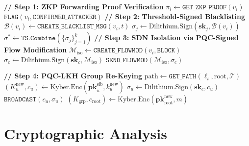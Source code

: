 \documentclass[12pt, a4paper]{report}
\begin{document}
\begin{algorithm}[htb]
\caption{Post-Quantum Cryptographic Mitigation and Node Isolation (\texttt{PQC-Mit})}
\begin{algorithmic}[1]
\small
{}
  \State \textbf{// Step 1: ZKP Forwarding Proof Verification}
  \State $\pi_i \gets \texttt{GET\_ZKP\_PROOF}(v_i)$
    \State $\texttt{FLAG}(v_i, \texttt{CONFIRMED\_ATTACKER})$
  \EndIf
  \State \textbf{// Step 2: Threshold-Signed Blacklisting}
  \State $\mathcal{B}(v_i) \gets \texttt{CREATE\_BLACKLIST\_MSG}(v_i, t)$
    \State $\sigma_j \gets \text{Dilithium.Sign}(\mathbf{sk}_j, \mathcal{B}(v_i))$
  \EndFor
  \State $\sigma^* \gets \texttt{TS.Combine}(\{\sigma_j\}_{j=1}^{k})$
    \State \textbf{// Step 3: SDN Isolation via PQC-Signed Flow Modification}
    \State $\mathcal{M}_{\text{iso}} \gets \texttt{CREATE\_FLOWMOD}(v_i, \texttt{BLOCK})$
    \State $\sigma_c \gets \text{Dilithium.Sign}(\mathbf{sk}_c, \mathcal{M}_{\text{iso}})$
    \State $\texttt{SEND\_FLOWMOD}(\mathcal{M}_{\text{iso}}, \sigma_c)$
    
    
  \State \textbf{// Step 4: PQC-LKH Group Re-Keying}
\State $\mathrm{path} \gets \texttt{GET\_PATH}(\ell_i, \mathrm{root}, \mathcal{T})$
  \State $(K_u^{\mathrm{new}}, c_u) \gets
         \mathrm{Kyber.Enc}(\mathbf{pk}_u^{\mathrm{sib}}, k_u^{\mathrm{new}})$
  \State $\sigma_u \gets \mathrm{Dilithium.Sign}(\mathbf{sk}_c, c_u)$
  \State $\texttt{BROADCAST}(c_u, \sigma_u)$
\EndFor
\State $(K_{\text{grp}}, c_{\mathrm{root}}) \gets
       \mathrm{Kyber.Enc}(\mathbf{pk}_{\mathrm{root}}^{\mathrm{new}}, m)$
  
  
  
  \EndIf




\EndProcedure
\end{algorithmic}
\label{alg:pqc_mit}
\end{algorithm}



\section{Cryptographic Analysis}
\label{sec:crypto_analysis}
\end{document}
